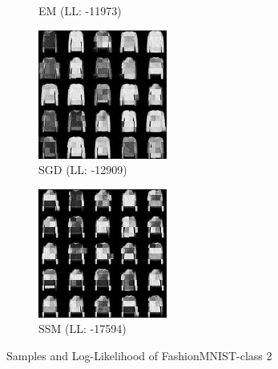 \begin{figure}[H]
\begin{subfigure}[b]{0.24\textwidth}
        \caption{EM (LL: -11973)}
    \end{subfigure}
    \begin{subfigure}[b]{0.24\textwidth}
        \centering
        \includegraphics[width=\textwidth]{figures/einsum/2fashion-mnist_SGD.png} 
        \caption{SGD (LL: -12909)}
    \end{subfigure}
    \begin{subfigure}[b]{0.24\textwidth}
        \centering
        \includegraphics[width=\textwidth]{figures/einsum/2fashion-mnist_SSM.png}
        \caption{SSM (LL: -17594)}
    \end{subfigure}
    \caption{Samples and Log-Likelihood of FashionMNIST-class 2}
\end{figure}

